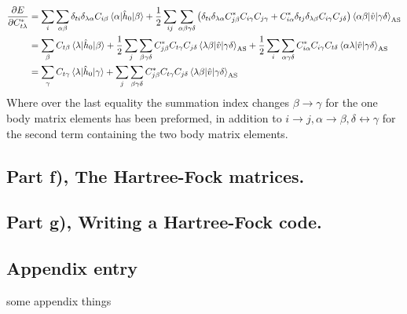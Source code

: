 \documentclass{article}
\newcommand{\inner}[3]{\braket{#1|#2|#3}}
\newcommand{\innerAS}[3]{\inner{#1}{#2}{#3}_{\text{AS}}}
\newcommand{\hnull}{\hat{h}_0}
\begin{document}
    \begin{align*}
        \pdv{E}{C^*_{t\lambda}} &= \sum_{i}\sum_{\alpha\beta} \delta_{ti}\delta_{\lambda\alpha} C_{i\beta} \inner{\alpha}{\hnull}{\beta} + \frac{1}{2}\sum_{ij}\sum_{\alpha\beta\gamma\delta} \left( \delta_{ti}\delta_{\lambda\alpha}C^*_{j\beta}C_{i\gamma}C_{j\gamma} + C^*_{i\alpha} \delta_{tj}\delta_{\lambda\beta} C_{i\gamma}C_{j\delta} \right) \innerAS{\alpha\beta}{\hat{v}}{\gamma\delta} \\
        &= \sum_{\beta} C_{t\beta} \inner{\lambda}{\hnull}{\beta} + \frac{1}{2}\sum_j \sum_{\beta\gamma\delta} C^*_{j\beta} C_{t\gamma} C_{j\delta} \innerAS{\lambda\beta}{\hat{v}}{\gamma\delta} + \frac{1}{2} \sum_i \sum_{\alpha\gamma\delta} C^*_{i\alpha} C_{i\gamma} C_{t\delta} \innerAS{\alpha\lambda}{\hat{v}}{\gamma\delta} \\
        &= \sum_\gamma C_{t\gamma} \inner{\lambda}{\hnull}{\gamma} + \sum_j \sum_{\beta\gamma\delta} C^*_{j\beta} C_{t\gamma} C_{j\delta} \innerAS{\lambda\beta}{\hat{v}}{\gamma\delta}
    \end{align*}
    Where over the last equality the summation index changes $\beta \rightarrow \gamma$ for the one body matrix elements has been preformed, in addition to $i \rightarrow j, \alpha \rightarrow \beta, \delta \leftrightarrow \gamma$ for the second term containing the two body matrix elements.  

\subsection*{Part f), The Hartree-Fock matrices.}
\subsection*{Part g), Writing a Hartree-Fock code.}


\begin{appendix}
    \section{Appendix entry}
    some appendix things
\end{appendix}
\cite{DFTgap}
\printbibliography
\end{document}
